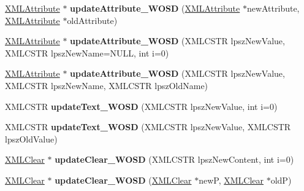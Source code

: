 \begin{DoxyCompactItemize}
\item 
\mbox{\label{struct_x_m_l_node_a62a2c0cad7809a03afc485351c9560da}} 
\hyperlink{struct_x_m_l_attribute}{X\+M\+L\+Attribute} $\ast$ {\bfseries update\+Attribute\+\_\+\+W\+O\+SD} (\hyperlink{struct_x_m_l_attribute}{X\+M\+L\+Attribute} $\ast$new\+Attribute, \hyperlink{struct_x_m_l_attribute}{X\+M\+L\+Attribute} $\ast$old\+Attribute)
\item 
\mbox{\label{struct_x_m_l_node_aab4e4f09a253842ec329f3af90b74cf9}} 
\hyperlink{struct_x_m_l_attribute}{X\+M\+L\+Attribute} $\ast$ {\bfseries update\+Attribute\+\_\+\+W\+O\+SD} (X\+M\+L\+C\+S\+TR lpsz\+New\+Value, X\+M\+L\+C\+S\+TR lpsz\+New\+Name=N\+U\+LL, int i=0)
\item 
\mbox{\label{struct_x_m_l_node_a25e0857638217206b11ee8fe99f7ed86}} 
\hyperlink{struct_x_m_l_attribute}{X\+M\+L\+Attribute} $\ast$ {\bfseries update\+Attribute\+\_\+\+W\+O\+SD} (X\+M\+L\+C\+S\+TR lpsz\+New\+Value, X\+M\+L\+C\+S\+TR lpsz\+New\+Name, X\+M\+L\+C\+S\+TR lpsz\+Old\+Name)
\item 
\mbox{\label{struct_x_m_l_node_adcff1825b8c39743e35df76db9d0a72d}} 
X\+M\+L\+C\+S\+TR {\bfseries update\+Text\+\_\+\+W\+O\+SD} (X\+M\+L\+C\+S\+TR lpsz\+New\+Value, int i=0)
\item 
\mbox{\label{struct_x_m_l_node_a79d26f52b800cb5f413cda3b08c4b89b}} 
X\+M\+L\+C\+S\+TR {\bfseries update\+Text\+\_\+\+W\+O\+SD} (X\+M\+L\+C\+S\+TR lpsz\+New\+Value, X\+M\+L\+C\+S\+TR lpsz\+Old\+Value)
\item 
\mbox{\label{struct_x_m_l_node_a70340d5baee0f1789149b459c9861b03}} 
\hyperlink{struct_x_m_l_clear}{X\+M\+L\+Clear} $\ast$ {\bfseries update\+Clear\+\_\+\+W\+O\+SD} (X\+M\+L\+C\+S\+TR lpsz\+New\+Content, int i=0)
\item 
\mbox{\label{struct_x_m_l_node_a25a713d21457706eabd8658bbce0b180}} 
\hyperlink{struct_x_m_l_clear}{X\+M\+L\+Clear} $\ast$ {\bfseries update\+Clear\+\_\+\+W\+O\+SD} (\hyperlink{struct_x_m_l_clear}{X\+M\+L\+Clear} $\ast$newP, \hyperlink{struct_x_m_l_clear}{X\+M\+L\+Clear} $\ast$oldP)
\item 
\mbox{\label{struct_x_m_l_node_a0b46f3ed1681e355e30120c43c410767}} 

\end{DoxyCompactItemize}
